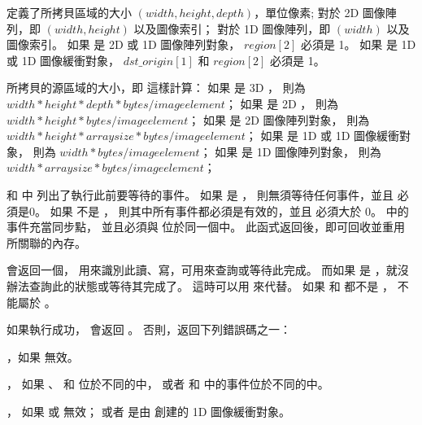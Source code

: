  定義了所拷貝區域的大小 $(width, height, depth)$，單位像素;
對於 2D 圖像陣列，即 $(width, height)$ 以及圖像索引；
對於 1D 圖像陣列，即 $(width)$ 以及圖像索引。
如果  是 2D  或 1D 圖像陣列對象， $region[2]$ 必須是 1。
如果  是 1D 或 1D 圖像緩衝對象，
$dst\_origin[1]$ 和 $region[2]$ 必須是 1。

所拷貝的源區域的大小，即  這樣計算：
如果  是 3D ，
則為 $width * height * depth * bytes/image element$；
如果  是 2D ，
則為 $width * height * bytes/image element$；
如果  是 2D 圖像陣列對象，
則為 $width * height * arraysize * bytes/image element$；
如果  是 1D 或 1D 圖像緩衝對象，
則為 $width * bytes/image element$；
如果  是 1D 圖像陣列對象，
則為 $width * arraysize * bytes/image element$；

 和  中
列出了執行此前要等待的事件。
如果  是 ，
則無須等待任何事件，並且  必須是0。
如果  不是 ，
則其中所有事件都必須是有效的，並且  必須大於 0。
 中的事件充當同步點，
並且必須與  位於同一個中。
此函式返回後，即可回收並重用  所關聯的內存。

 會返回一個，
用來識別此讀、寫，可用來查詢或等待此完成。
而如果  是 ，就沒辦法查詢此的狀態或等待其完成了。
這時可以用  來代替。
如果  和  都不是 ，
 不能屬於 。

如果執行成功，  會返回 。
否則，返回下列錯誤碼之一：
\startigBase
\item {}，如果  無效。

\item {}，
如果 、  和  位於不同的中，
或者  和  中的事件位於不同的中。

\item {}，
如果  或  無效；
或者  是由  創建的 1D 圖像緩衝對象。

